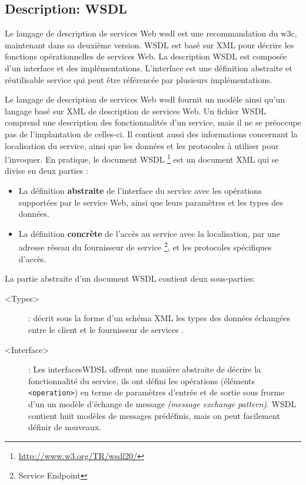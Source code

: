   \subsection{Description: WSDL}
  \label{sec:wsdl}
  Le langage de description de services Web \acrshort{wsdl}
  \cite{christensen2001web, chinnici2007web} est une recommandation du
  \acrshort{w3c}, maintenant dans sa deuxième version.  \textsc{WSDL}
  est basé sur \textsc{XML} pour décrire les fonctions opérationnelles
  de services Web. La description \textsc{WSDL} est composée d'un
  interface et des implémentations. L'interface est une définition
  abstraite et réutilisable service qui peut être référencée par
  plusieurs implémentations.

  

  Le langage de description de services Web \acrshort{wsdl}
  \cite{chinnici2007web} fournit un modèle ainsi qu'un langage basé
  sur \textsc{XML} de description de services Web. Un fichier
  \textsc{WSDL} comprend une description des fonctionnalités d'un
  service, mais il ne se préoccupe pas de l'implantation de celles-ci.
  Il contient aussi des informations concernant la localisation du
  service, ainsi que les données et les protocoles à utiliser pour
  l'invoquer. En pratique, le document \textsc{WSDL}
  \footnote{\url{http://www.w3.org/TR/wsdl20/}} est un document
  \textsc{XML} qui se divise en deux parties \cite{elie2010} :

  \SpecialItem
  \begin{itemize}
  \item La définition \textbf{abstraite} de l'interface du service
    avec les opérations supportées par le service Web, ainsi que leurs
    paramètres et les types des données.

  \item La définition \textbf{concrète} de l'accès au service avec la
    localisation, par une adresse réseau du fournisseur de service
    \footnote{Service Endpoint}, et les protocoles spécifiques
    d'accès.
  \end{itemize}

  La partie abstraite d'un document \textsc{WSDL} contient deux
  sous-parties:

  \SpecialItem
  \renewcommand{\descriptionlabel}[1]{\hspace{1.5cm}\texttt{#1}}
  \begin{description}
  \item[<Types>]: décrit sous la forme d'un schéma \textsc{XML} les
    types des données échangées entre le client et le fournisseur de
    services \cite{part20012}.

  \item[<Interface>]: Les interfaces\textsc{WDSL} offrent une manière
    abstraite de décrire la fonctionnalité du service, ils ont défini
    les opérations (éléments \texttt{<operation>}) en terme de
    paramètres d'entrée et de sortie sous frorme d'un un modèle
    d'échange de message \textit{(message exchange
      pattern)}. \textsc{WSDL} contient huit modèles de messages
    prédéfinis, mais on peut facilement définir de nouveaux.
  \end{description}

